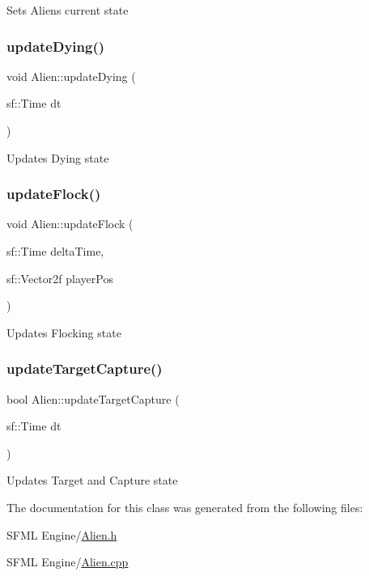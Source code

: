 Sets Aliens current state \mbox{\label{class_alien_aa85a70c1e7ed8d7d728df94ad47b83a2}} 
\subsubsection{\texorpdfstring{update\+Dying()}{updateDying()}}
{\footnotesize\ttfamily void Alien\+::update\+Dying (\begin{DoxyParamCaption}\item[{sf\+::\+Time}]{dt }\end{DoxyParamCaption})}

Updates Dying state \mbox{\label{class_alien_a831772470c94eed62a50c173b002c513}} 
\subsubsection{\texorpdfstring{update\+Flock()}{updateFlock()}}
{\footnotesize\ttfamily void Alien\+::update\+Flock (\begin{DoxyParamCaption}\item[{sf\+::\+Time}]{delta\+Time,  }\item[{sf\+::\+Vector2f}]{player\+Pos }\end{DoxyParamCaption})}

Updates Flocking state \mbox{\label{class_alien_a6081c8a068679e203e6e920b9197e4de}} 
\subsubsection{\texorpdfstring{update\+Target\+Capture()}{updateTargetCapture()}}
{\footnotesize\ttfamily bool Alien\+::update\+Target\+Capture (\begin{DoxyParamCaption}\item[{sf\+::\+Time}]{dt }\end{DoxyParamCaption})}

Updates Target and Capture state 

The documentation for this class was generated from the following files\+:\begin{DoxyCompactItemize}
\item 
S\+F\+M\+L Engine/\hyperlink{_alien_8h}{Alien.\+h}\item 
S\+F\+M\+L Engine/\hyperlink{_alien_8cpp}{Alien.\+cpp}\end{DoxyCompactItemize}
